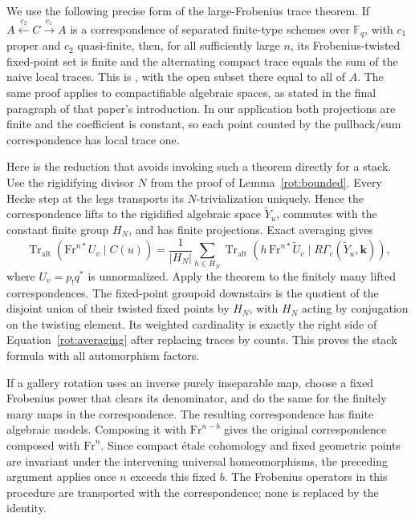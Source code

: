 We use the following precise form of the large-Frobenius trace theorem.
If $A\xleftarrow{c_2}C\xrightarrow{c_1}A$ is a correspondence of
separated finite-type schemes over $\mathbb F_q$, with $c_1$ proper and
$c_2$ quasi-finite, then, for all sufficiently large $n$, its
Frobenius-twisted fixed-point set is finite and the alternating compact
trace equals the sum of the naive local traces.
This is \cite[Theorem~2.3.2(a),(b) and Remark~2.3.3(c)]{Varshavsky},
with the open subset there equal to all of $A$.  The same proof applies
to compactifiable algebraic spaces, as stated in the final paragraph
of that paper's introduction.  In our application both projections
are finite and the coefficient is constant, so each point counted by
the pullback/sum correspondence has local trace one.

Here is the reduction that avoids invoking such a theorem directly
for a stack.  Use the rigidifying divisor $N$ from the proof of
Lemma~\ref{rot:bounded}.  Every Hecke step at the legs transports its
$N$-trivialization uniquely.  Hence the correspondence lifts to the
rigidified algebraic space $\widetilde Y_u$, commutes with the constant
finite group $H_N$, and has finite projections.  Exact averaging gives
\begin{equation}\label{rot:averaging}
 \operatorname{Tr}_{\mathrm{alt}}(\mathrm{Fr}^{n*}U_v\mid C(u))
 =\frac1{|H_N|}\sum_{h\in H_N}
   \operatorname{Tr}_{\mathrm{alt}}
       (h\,\mathrm{Fr}^{n*}\widetilde U_v\mid
                     R\Gamma_c(\widetilde Y_u,\mathbf k)),
\end{equation}
where $U_v=p_!q^*$ is unnormalized.  Apply the theorem to the finitely
many lifted correspondences.  The fixed-point groupoid downstairs is
the quotient of the disjoint union of their twisted fixed points by
$H_N$, with $H_N$ acting by conjugation on the twisting element.
Its weighted cardinality is exactly the right side of
Equation~\eqref{rot:averaging} after replacing traces by counts.
This proves the stack formula with all automorphism factors.

If a gallery rotation uses an inverse purely inseparable map, choose a
fixed Frobenius power that clears its denominator, and do the same for
the finitely many maps in the correspondence.  The resulting
correspondence has finite algebraic models.  Composing it with
$\mathrm{Fr}^{n-b}$ gives the original correspondence composed with
$\mathrm{Fr}^n$.  Since compact \'etale cohomology and fixed geometric
points are invariant under the intervening universal homeomorphisms,
the preceding argument applies once $n$ exceeds this fixed $b$.
The Frobenius operators in this procedure are transported with the
correspondence; none is replaced by the identity.

